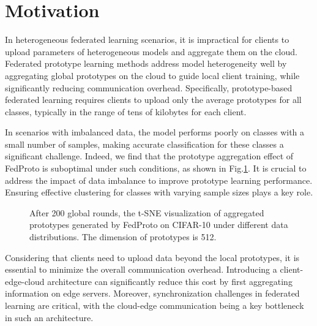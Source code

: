 \documentclass[journal]{IEEEtran}
\begin{document}
\section{Motivation}
In heterogeneous federated learning scenarios, it is impractical for clients to upload parameters of heterogeneous models and aggregate them on the cloud. Federated prototype learning methods address model heterogeneity well by aggregating global prototypes on the cloud to guide local client training, while significantly reducing communication overhead. Specifically, prototype-based federated learning requires clients to upload only the average prototypes for all classes, typically in the range of tens of kilobytes for each client. 

In scenarios with imbalanced data, the model performs poorly on classes with a small number of samples, making accurate classification for these classes a significant challenge. Indeed, we find that the prototype aggregation effect of FedProto\cite{tan_fedproto_2021} is suboptimal under such conditions, as shown in Fig.\ref{motivation_tsne}. It is crucial to address the impact of data imbalance to improve prototype learning performance. Ensuring effective clustering for classes with varying sample sizes plays a key role.

\begin{figure}[H]
    \centering
    \hfill

    \caption{After 200 global rounds, the t-SNE visualization of aggregated prototypes generated by FedProto on CIFAR-10 under different data distributions. The dimension of prototypes is 512.}
    \label{motivation_tsne}
\end{figure}
Considering that clients need to upload data beyond the local prototypes, it is essential to minimize the overall communication overhead. Introducing a client-edge-cloud architecture \cite{liu_client-edge-cloud_2020,liu_hierarchical_2023} can significantly reduce this cost by first aggregating information on edge servers. Moreover, synchronization challenges in federated learning are critical, with the cloud-edge communication being a key bottleneck in such an architecture. 
\end{document}
